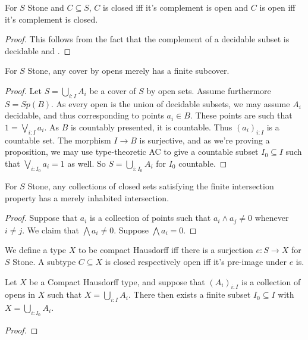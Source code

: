 \begin{lemma}
  For $S$ Stone and $C\subseteq S$, 
  $C$ is closed iff it's complement is open 
  and $C$ is open iff it's complement is closed. 
\end{lemma}
\begin{proof}
  This follows from the fact that the complement of a decidable subset is decidable and 
  .
\end{proof}
\begin{lemma}
  For $S$ Stone, any cover by opens merely has a finite subcover.
\end{lemma}
\begin{proof}
  Let $S= \bigcup_{i:I} A_i$ be a cover of $S$ by open sets. 
  Assume furthermore $S= Sp(B)$. 
  As every open is the union of decidable subsets, we may assume $A_i$ decidable, 
  and thus corresponding to points $a_i \in B$. 
  These points are such that $1 = \bigvee_{i:I} a_i$. 
  As $B$ is countably presented, it is countable. 
  Thus $(a_i)_{i:I}$ is a countable set. 
  The morphism $I\to B$ is surjective, and as we're proving a proposition,
  we may use type-theoretic AC to give 
  a countable subset $I_0 \subseteq I$ such that $\bigvee_{i:I_0} a_i = 1$ as well. 
  So $S = \bigcup_{i:I_0} A_i$ for $I_0$ countable. 
\end{proof}

\begin{lemma}
  For $S$ Stone, any collections of closed sets satisfying the finite intersection property 
  has a merely inhabited intersection. 
\end{lemma}
\begin{proof}
  Suppose that $a_i$ is a collection of points such that $a_i \wedge a_j \neq 0$ whenever $i\neq j$. 
  We claim that $\bigwedge a_i \neq 0$. 
  Suppose $\bigwedge a_i = 0$. 
\end{proof}


\begin{definition}
We define a type $X$ to be compact Hausdorff iff 
there is a surjection $e:S\to X$ for $S$ Stone. 
%
A subtype $C\subseteq X$ is closed respectively open iff it's pre-image under $e$ is. 
\end{definition}

\begin{lemma}
  Let $X$ be a Compact Hausdorff type, 
  and suppose that $(A_i)_{i:I}$ is a collection of opens in $X$ such that 
  $X = \bigcup_{i:I} A_i$. 
  There then exists a finite subset $I_0\subseteq I$ with 
  $X = \bigcup_{i:I_0} A_i$. 
\end{lemma} 
\begin{proof}

\end{proof}

